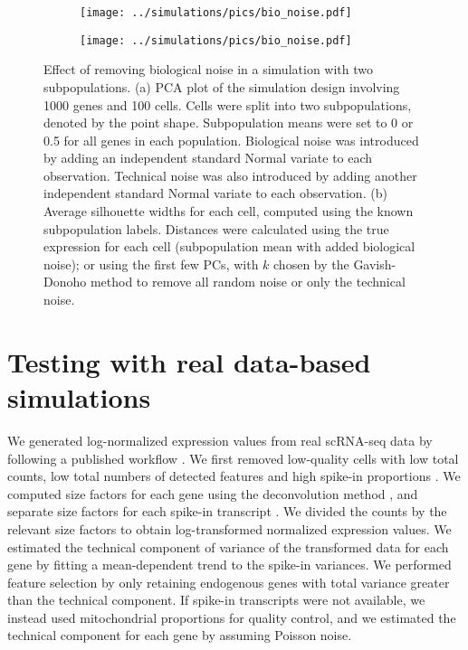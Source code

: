 \documentclass[10pt,letterpaper]{article}
\begin{document}
\begin{figure}[btp]
\centering
\begin{subfigure}[b]{0.49\textwidth}
\texttt{[image: ../simulations/pics/bio\_noise.pdf]}
\caption{}
\end{subfigure}
\begin{subfigure}[b]{0.49\textwidth}
\texttt{[image: ../simulations/pics/bio\_noise.pdf]}
\caption{}
\end{subfigure}
\caption{Effect of removing biological noise in a simulation with two subpopulations.
(a) PCA plot of the simulation design involving 1000 genes and 100 cells.
Cells were split into two subpopulations, denoted by the point shape.
Subpopulation means were set to 0 or 0.5 for all genes in each population.
Biological noise was introduced by adding an independent standard Normal variate to each observation.
Technical noise was also introduced by adding another independent standard Normal variate to each observation.
(b) Average silhouette widths for each cell, computed using the known subpopulation labels.
Distances were calculated using the true expression for each cell (subpopulation mean with added biological noise);
or using the first few PCs, with $k$ chosen by the Gavish-Donoho method to remove all random noise or only the technical noise.
}
\label{fig:bionoise}
\end{figure}

\section{Testing with real data-based simulations}

We generated log-normalized expression values from real scRNA-seq data by following a published workflow \cite{lun2016stepbystep}.
We first removed low-quality cells with low total counts, low total numbers of detected features and high spike-in proportions \cite{mccarthy2017scater}.
We computed size factors for each gene using the deconvolution method \cite{lun2016pooling}, and separate size factors for each spike-in transcript \cite{lun2017assessing}.
We divided the counts by the relevant size factors to obtain log-transformed normalized expression values.
We estimated the technical component of variance of the transformed data for each gene by fitting a mean-dependent trend to the spike-in variances.
We performed feature selection by only retaining endogenous genes with total variance greater than the technical component.
If spike-in transcripts were not available, we instead used mitochondrial proportions for quality control,
and we estimated the technical component for each gene by assuming Poisson noise.  
\end{document}
